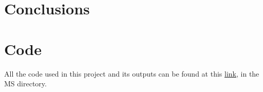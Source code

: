 \documentclass[12pt]{article}
\begin{document}
\section{Conclusions}
\section{Code}
All the code used in this project and its outputs can be found at this \href{https://github.com/Confizolo/PoDProjects}{link}, in the MS directory.
\end{document}
